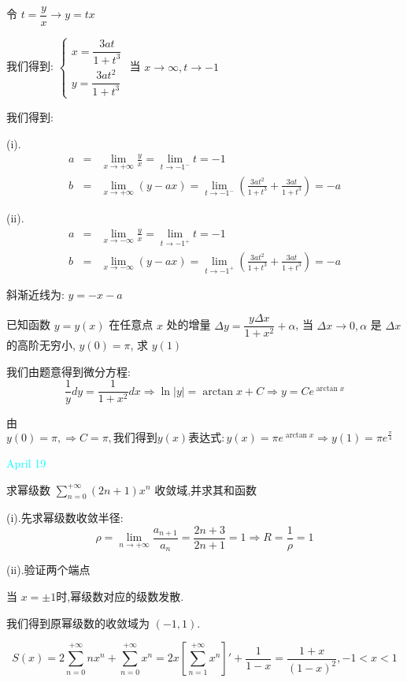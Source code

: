 \begin{solution}
	
	令 $t=\dfrac{y}{x}\to y=tx$
	
	我们得到: $\left\lbrace 
	\begin{array}{l}
		x=\dfrac{3at}{1+t^3}\\
		y=\dfrac{3at^2}{1+t^3}
	\end{array}
	\right. $
	当 $x\to \infty,t\to -1$
	
	我们得到: 
	
	(i).
	\begin{eqnarray*}
		a&=&\lim\limits_{x\to +\infty}\frac{y}{x}=\lim\limits_{t\to -1^{-} }t=-1\\
		b&=&\lim\limits_{x\to +\infty}(y-ax)=\lim\limits_{t\to -1^{-}}(\frac{3at^2}{1+t^3}+\frac{3at}{1+t^3})=-a
	\end{eqnarray*}
	
	(ii).
	\begin{eqnarray*}
		a&=&\lim\limits_{x\to -\infty}\frac{y}{x}=\lim\limits_{t\to -1^{+} }t=-1\\
		b&=&\lim\limits_{x\to -\infty}(y-ax)=\lim\limits_{t\to -1^{+}}(\frac{3at^2}{1+t^3}+\frac{3at}{1+t^3})=-a
	\end{eqnarray*}
	
	斜渐近线为: $y=-x-a$
\end{solution}

\begin{example}[][Exam: 30.3.8]
	已知函数 $y=y(x)$ 在任意点 $x$ 处的增量 $\Delta y=\dfrac{y\Delta x}{1+x^2}+\alpha$,
	当 $\Delta x\to 0,\alpha$ 是 $\Delta x$ 的高阶无穷小, $y(0)=\pi$, 求 $y(1)$
\end{example}

\begin{solution}
	
	我们由题意得到微分方程: 
	$$\frac{1}{y}dy=\frac{1}{1+x^2}dx\Rightarrow \ln|y|=\arctan x+C\Rightarrow y=Ce^{\arctan x}$$
	
	由 $y(0)=\pi,\Rightarrow C=\pi,\text{我们得到}y(x)\text{表达式}: y(x)=\pi e^{\arctan x}\Rightarrow y(1)=\pi e^{\frac{\pi}{4}}$
\end{solution}


\textcolor{cyan}{April 19}

\begin{example}[][Exam: 30.3.9]
	求幂级数 $\sum\limits_{n=0}^{+\infty}(2n+1)x^n$ 收敛域,并求其和函数
\end{example}

\begin{solution}
	
	(i).先求幂级数收敛半径: 
	$$\rho=\lim\limits_{n\to +\infty}\frac{a_{n+1}}{a_{n}}=\frac{2n+3}{2n+1}=1\Rightarrow R=\frac{1}{\rho}=1$$
	
	(ii).验证两个端点
	
	当 $x=\pm1$时,幂级数对应的级数发散.
	
	我们得到原幂级数的收敛域为 $(-1,1)$.
	
	$$S(x)=2\sum\limits_{n=0}^{+\infty}nx^n+\sum\limits_{n=0}^{+\infty}x^n=2x[\sum\limits_{n=1}^{+\infty}x^n]'+\frac{1}{1-x}=\frac{1+x}{(1-x)^2},-1<x<1$$
\end{solution}

